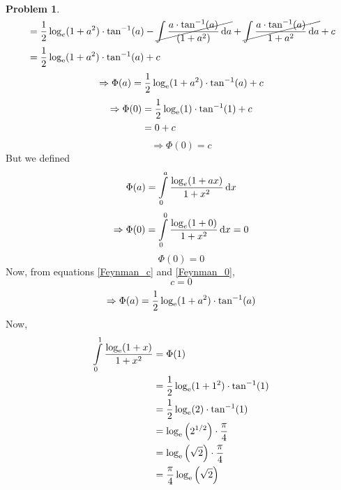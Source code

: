 \documentclass[14]{article}
\theoremstyle{definition}
\newtheorem{prob}{Problem}
\theoremstyle{case}
\begin{document}
\begin{prob}
\begin{align*}
&= \dfrac12 \log_e(1+a^2) \cdot \tan^{-1}(a) - \cancel{\int \dfrac{a \cdot \tan^{-1}(a)}{(1+a^2)} \dif a} + \cancel{\int \dfrac{a \cdot \tan^{-1}(a)}{1+a^2} \dif a} + c\\
&= \dfrac12 \log_{\rm e}(1+a^2) \cdot \tan^{-1}(a) + c
\end{align*}
\pagebreak
\[\Rightarrow \Phi(a) = \dfrac12 \log_{\rm e}(1+a^2) \cdot \tan^{-1}(a) + c\]
\begin{align*}
\Rightarrow \Phi(0) &= \dfrac12 \log_{\rm e}(1) \cdot \tan^{-1}(1) + c\\ &= 0 + c
\end{align*}
\begin{equation}\label{Feynman_c}
\Rightarrow\Phi(0) = c
\end{equation}
But we defined
\[\Phi(a) = \int\limits_0^a \dfrac{\log_e(1+ax)}{1+x^2} \dif x\]
\[\Rightarrow \Phi(0) = \int\limits_0^0 \dfrac{\log_e(1+0)}{1+x^2} \dif x = 0\]
\begin{equation}\label{Feynman_0}
\Phi(0) = 0
\end{equation}
Now, from equations \eqref{Feynman_c} and \eqref{Feynman_0},
\[c = 0\]
\[\Rightarrow \Phi(a) = \dfrac12 \log_{\rm e}(1+a^2) \cdot \tan^{-1}(a)\]
Now,
\begin{align*}
\int\limits_0^1 \dfrac{\log_{\rm e}(1+x)}{1+x^2} &= \Phi(1)\\
&= \dfrac12 \log_{\rm e}(1+1^2) \cdot \tan^{-1}(1)\\
&= \dfrac12 \log_{\rm e}(2) \cdot \tan^{-1}(1)\\
&= \log_{\rm e}\left(2^{1/2}\right) \cdot \dfrac{\pi}{4}\\
&= \log_{\rm e}\left(\sqrt2\right) \cdot \dfrac{\pi}{4}\\
&= \dfrac{\pi}{4} \log_{\rm e}\left(\sqrt2\right)
\end{align*}
\end{prob}
\end{document}
